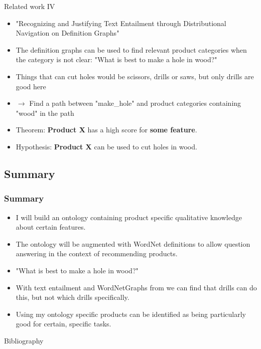 \documentclass{beamer}
\begin{document}
\begin{frame}{Related work IV}
    \begin{itemize}
        \item "Recognizing and Justifying Text Entailment through Distributional Navigation on Definition Graphs"\\
        \cite{silva2018recognizing}
        \item The definition graphs can be used to find relevant product categories when the category is not clear: "What is best to make a hole in wood?"
        \item Things that can cut holes would be scissors, drills or saws, but only drills are good here
        \item $\rightarrow$ Find a path between "make\_hole" and product categories containing "wood" in the path
        \item Theorem: \textbf{Product X} has a high score for \textbf{some feature}.
        \item Hypothesis: \textbf{Product X} can be used to cut holes in wood.
    \end{itemize}
\end{frame}

\begin{frame}
\section{Summary}
\frametitle{Summary}
    \begin{itemize}
        \item I will build an ontology containing product specific qualitative knowledge about certain features.
        \item The ontology will be augmented with WordNet definitions to allow question answering in the context of recommending products.
        \item "What is best to make a hole in wood?"
        \item With text entailment and WordNetGraphs from \cite{silva2018recognizing} we can find that drills can do this, but not which drills specifically.
        \item Using my ontology specific products can be identified as being particularly good for certain, specific tasks.
    \end{itemize}
\end{frame}


\begin{frame}[allowframebreaks]{Bibliography}


\end{frame}
\end{document}
